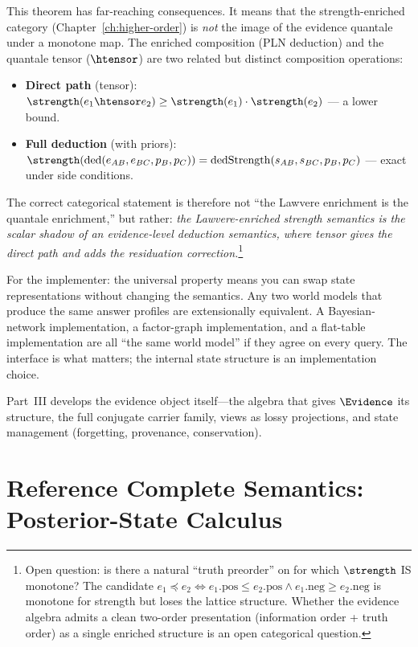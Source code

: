 \documentclass[11pt,openany]{report}
\begin{document}
This theorem has far-reaching consequences.  It means that the
strength-enriched category (Chapter~\ref{ch:higher-order}) is
\emph{not} the image of the evidence quantale under a monotone map.
The enriched composition (PLN deduction) and the quantale tensor
($\htensor$) are two related but distinct composition operations:
\begin{itemize}
\item \textbf{Direct path} (tensor): $\strength(e_1 \htensor e_2)
  \ge \strength(e_1) \cdot \strength(e_2)$ --- a lower bound.
\item \textbf{Full deduction} (with priors): $\strength(\mathrm{ded}(e_{AB},
  e_{BC}, p_B, p_C)) = \mathrm{dedStrength}(s_{AB}, s_{BC}, p_B, p_C)$
  --- exact under side conditions.
\end{itemize}

\noindent
The correct categorical statement is therefore not ``the Lawvere
enrichment is the quantale enrichment,'' but rather: \emph{the
Lawvere-enriched strength semantics is the scalar shadow of an
evidence-level deduction semantics, where tensor gives the direct
path and  adds the residuation
correction.}\footnote{Open question: is there a natural ``truth
preorder'' on \Evidence{} for which $\strength$ IS monotone?  The
candidate $e_1 \preceq e_2 \iff e_1.\mathrm{pos} \le e_2.\mathrm{pos}
\wedge e_1.\mathrm{neg} \ge e_2.\mathrm{neg}$ is monotone for strength
but loses the lattice structure.  Whether the evidence algebra admits
a clean two-order presentation (information order + truth order) as a
single enriched structure is an open categorical question.}

\medskip\noindent
For the implementer: the universal property means you can swap state
representations without changing the semantics.  Any two world models
that produce the same answer profiles are extensionally equivalent.  A
Bayesian-network implementation, a factor-graph implementation, and a
flat-table implementation are all ``the same world model'' if they agree
on every query.  The interface is what matters; the internal state
structure is an implementation choice.

Part~III develops the evidence object itself---the algebra that gives
$\Evidence$ its structure, the full conjugate carrier family, views as
lossy projections, and state management (forgetting, provenance,
conservation).


\chapter{Reference Complete Semantics: Posterior-State Calculus}
\label{ch:posterior-state}
\end{document}
